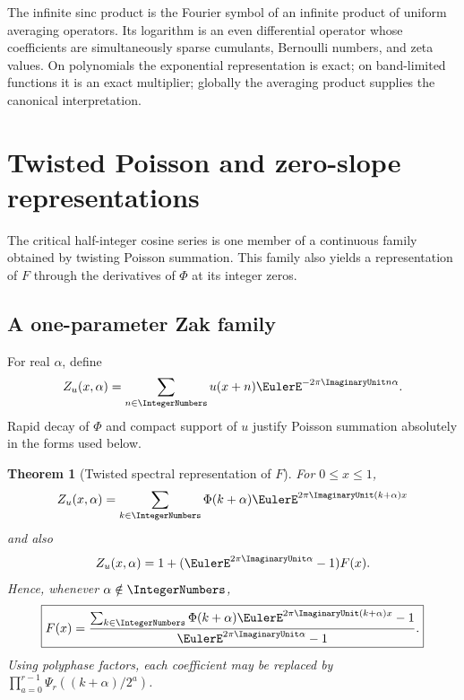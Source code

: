 \documentclass[11pt]{article}
\newtheorem{theorem}{Theorem}[section]
\theoremstyle{definition}
\theoremstyle{remark}
\begin{document}
\begin{resultboxPartiv}
The infinite sinc product is the Fourier symbol of an infinite product of
uniform averaging operators.  Its logarithm is an even differential operator
whose coefficients are simultaneously sparse cumulants, Bernoulli numbers,
and zeta values.  On polynomials the exponential representation is exact; on
band-limited functions it is an exact multiplier; globally the averaging
product supplies the canonical interpretation.
\end{resultboxPartiv}

\section{Twisted Poisson and zero-slope representations}
\label{p5:sec:Zak}

The critical half-integer cosine series is one member of a continuous family
obtained by twisting Poisson summation.  This family also yields a representation
of $F$ through the derivatives of $\Phi$ at its integer zeros.

\subsection{A one-parameter Zak family}

For real $\alpha$, define
\begin{equation}
 Z_u(x,\alpha)=\sum_{n\in\IntegerNumbers}u(x+n)\EulerE^{-2\pi\ImaginaryUnit n\alpha}.   \label{p5:eq:Zak-def}
\end{equation}
Rapid decay of $\Phi$ and compact support of $u$ justify Poisson summation
absolutely in the forms used below.

\begin{theorem}[Twisted spectral representation of $F$]
\label{p5:thm:twisted-F}
For $0\le x\le1$,
\begin{equation}
 Z_u(x,\alpha)
 =\sum_{k\in\IntegerNumbers}\Phi(k+\alpha)
   \EulerE^{2\pi\ImaginaryUnit(k+\alpha)x}                                \label{p5:eq:Zak-Poisson}
\end{equation}
and also
\begin{equation}
 Z_u(x,\alpha)=1+(\EulerE^{2\pi\ImaginaryUnit\alpha}-1)F(x).             \label{p5:eq:Zak-fold}
\end{equation}
Hence, whenever $\alpha\notin\IntegerNumbers$,
\begin{equation}
 \boxed{\displaystyle
 F(x)=\frac{
   \sum_{k\in\IntegerNumbers}\Phi(k+\alpha)
       \EulerE^{2\pi\ImaginaryUnit(k+\alpha)x}-1}
  {\EulerE^{2\pi\ImaginaryUnit\alpha}-1}.}                              \label{p5:eq:F-twisted-Poisson}
\end{equation}
Using polyphase factors, each coefficient may be replaced by
$\prod_{a=0}^{r-1}\Psi_r((k+\alpha)/2^a)$.
\end{theorem}
\end{document}
